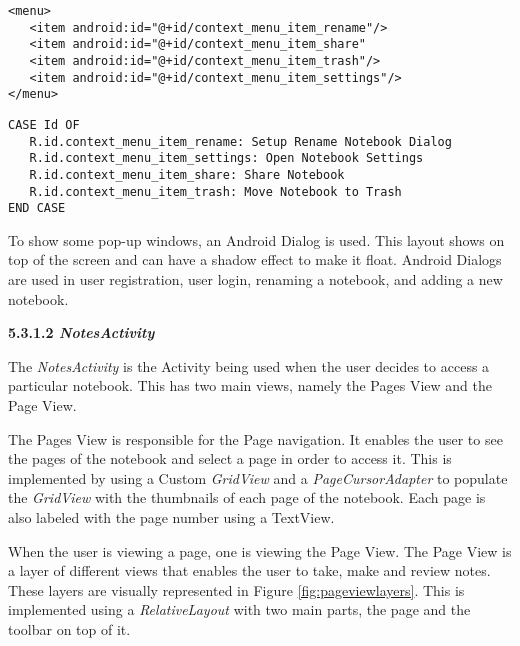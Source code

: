\begin{lstlisting}[frame=single, label=lst:notebookxml, caption=Codes of notebook.xml]
<menu>
   <item android:id="@+id/context_menu_item_rename"/>
   <item android:id="@+id/context_menu_item_share"
   <item android:id="@+id/context_menu_item_trash"/>
   <item android:id="@+id/context_menu_item_settings"/>
</menu>
\end{lstlisting}

\begin{lstlisting}[frame=single, label=lst:oncontextitemselected, caption=\textit{onContextItemSelected} pseudocode]
CASE Id OF
   R.id.context_menu_item_rename: Setup Rename Notebook Dialog
   R.id.context_menu_item_settings: Open Notebook Settings
   R.id.context_menu_item_share: Share Notebook
   R.id.context_menu_item_trash: Move Notebook to Trash
END CASE 
\end{lstlisting}

To show some pop-up windows, an Android Dialog is used. This layout shows on top of the screen and can have a shadow effect to make it float. Android Dialogs are used in user registration, user login, renaming a notebook, and adding a new notebook.

\pagebreak

\begin{flushleft}
\textbf{5.3.1.2 \textit{NotesActivity}}
\end{flushleft}

\begin{raggedright}
The \textit{NotesActivity} is the Activity being used when the user decides to access a particular notebook. This has two main views, namely the Pages View and the Page View. 
\end{raggedright}

The Pages View is responsible for the Page navigation. It enables the user to see the pages of the notebook and select a page in order to access it. This is implemented by using a Custom \textit{GridView} and a \textit{PageCursorAdapter} to populate the \textit{GridView} with the thumbnails of each page of the notebook. Each page is also labeled with the page number using a TextView.

When the user is viewing a page, one is viewing the Page View. The Page View is a layer of different views that enables the user to take, make and review notes. These layers are visually represented in Figure \ref{fig:pageviewlayers}. This is implemented using a \textit{RelativeLayout} with two main parts, the page and the toolbar on top of it. 

